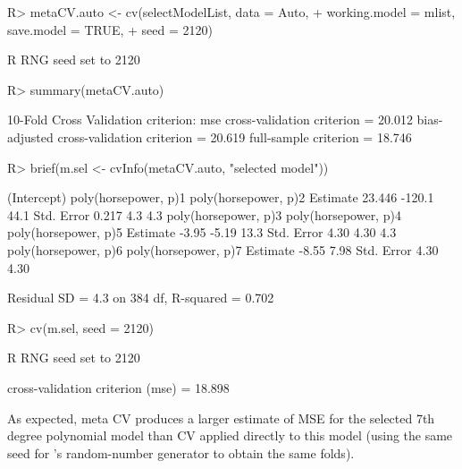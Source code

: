\documentclass[
]{jss}
\begin{document}
\begin{CodeChunk}
\begin{CodeInput}
R> metaCV.auto <- cv(selectModelList, data = Auto,
+                   working.model = mlist, save.model = TRUE,
+                        seed = 2120)
\end{CodeInput}
\begin{CodeOutput}
R RNG seed set to 2120
\end{CodeOutput}
\begin{CodeInput}
R> summary(metaCV.auto)
\end{CodeInput}
\begin{CodeOutput}
10-Fold Cross Validation
criterion: mse
cross-validation criterion = 20.012
bias-adjusted cross-validation criterion = 20.619
full-sample criterion = 18.746
\end{CodeOutput}
\begin{CodeInput}
R> brief(m.sel <- cvInfo(metaCV.auto, "selected model"))
\end{CodeInput}
\begin{CodeOutput}
           (Intercept) poly(horsepower, p)1 poly(horsepower, p)2
Estimate        23.446               -120.1                 44.1
Std. Error       0.217                  4.3                  4.3
           poly(horsepower, p)3 poly(horsepower, p)4 poly(horsepower, p)5
Estimate                  -3.95                -5.19                 13.3
Std. Error                 4.30                 4.30                  4.3
           poly(horsepower, p)6 poly(horsepower, p)7
Estimate                  -8.55                 7.98
Std. Error                 4.30                 4.30

 Residual SD = 4.3 on 384 df, R-squared = 0.702
\end{CodeOutput}
\begin{CodeInput}
R> cv(m.sel, seed = 2120)
\end{CodeInput}
\begin{CodeOutput}
R RNG seed set to 2120
\end{CodeOutput}
\begin{CodeOutput}
cross-validation criterion (mse) = 18.898
\end{CodeOutput}
\end{CodeChunk}

As expected, meta CV produces a larger estimate of MSE for the selected
7th degree polynomial model than CV applied directly to this model
(using the same seed for 's random-number generator to
obtain the same folds).
\end{document}
